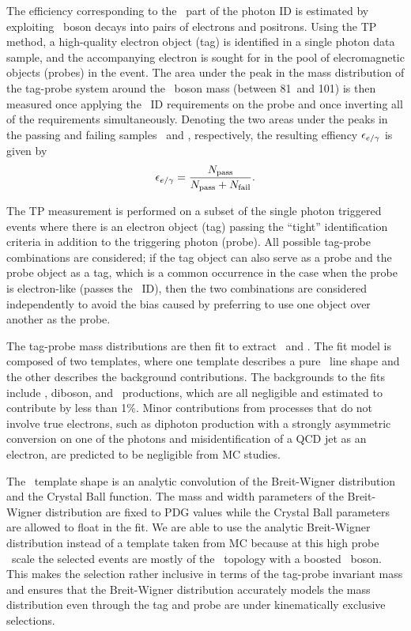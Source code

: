 The efficiency corresponding to the \egamma\ part of the photon ID is estimated by exploiting \PZ\ boson decays into pairs of electrons and positrons.
Using the TP method, a high-quality electron object (tag) is identified in a single photon data sample, and the accompanying electron is sought for in the pool of elecromagnetic objects (probes) in the event. 
The area under the peak in the mass distribution of the tag-probe system around the \PZ\ boson mass (between 81\GeV\ and 101\GeV) is then measured once applying the \Pe\Pgg\ ID requirements on the probe and once inverting all of the requirements simultaneously. 
Denoting the two areas under the peaks in the passing and failing samples \npass\ and \nfail, respectively, the resulting effiency $\epsilon_{{e}/\gamma}$ is given by
\begin{equation}
\epsilon_{{e}/\gamma} = \frac{N_{\text{pass}}}{N_{\text{pass}} + N_{\text{fail}}}.
\end{equation}

The TP measurement is performed on a subset of the single photon triggered events where there is an electron object (tag) passing the ``tight'' identification criteria in addition to the triggering photon (probe). 
All possible tag-probe combinations are considered; if the tag object can also serve as a probe and the probe object as a tag, which is a common occurrence in the case when the probe is electron-like (passes the \Pe\Pgg\ ID), then the two combinations are considered independently to avoid the bias caused by preferring to use one object over another as the probe.

The tag-probe mass distributions are then fit to extract \npass\ and \nfail. 
The fit model is composed of two templates, where one template describes a pure \Zee\ line shape and the other describes the background contributions. 
The backgrounds to the fits include \wj, diboson, and \ttbar\ productions, which are all negligible and estimated to contribute by less than 1\%. 
Minor contributions from processes that do not involve true electrons, such as diphoton production with a strongly asymmetric conversion on one of the photons and misidentification of a QCD jet as an electron, are predicted to be negligible from MC studies.
 
The \Zee\ template shape is an analytic convolution of the Breit-Wigner distribution and the Crystal Ball function. 
The mass and width parameters of the Breit-Wigner distribution are fixed to PDG values while the Crystal Ball parameters are allowed to float in the fit.
We are able to use the analytic Breit-Wigner distribution instead of a template taken from MC because at this high probe \pt\ scale the selected events are mostly of the \zj\ topology with a boosted \PZ\ boson.
This makes the selection rather inclusive in terms of the tag-probe invariant mass and ensures that the Breit-Wigner distribution accurately models the mass distribution even through the tag and probe are under kinematically exclusive selections.

